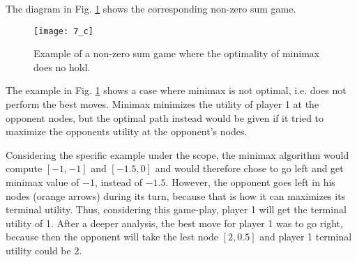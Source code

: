 The diagram in Fig. \ref{fig:7_c_first} shows the corresponding non-zero sum game.
\begin{figure}[h]
    \centering
    \texttt{[image: 7\_c]}
    \caption{Example of a non-zero sum game where the optimality of minimax does no hold.}
    \label{fig:7_c_first}
\end{figure}

The example in Fig. \ref{fig:7_c_first} shows a case where minimax is not optimal, i.e. does not perform the best moves. Minimax minimizes the utility of player 1 at the opponent nodes, but the optimal path instead would be given if it tried to maximize the opponents utility at the opponent's nodes.

Considering the specific example under the scope, the minimax algorithm would compute $[-1,-1]$ and $[-1.5,0]$ and would therefore chose to go left and get minimax value of $-1$, instead of $-1.5$. However, the opponent goes left in his nodes (orange arrows) during its turn, because that is how it can maximizes its terminal utility. Thus, considering this game-play, player 1 will get the terminal utility of 1. After a deeper analysis, the best move for player 1 was to go right, because then the opponent will take the lest node $[2,0.5]$ and player 1 terminal utility could be 2.
